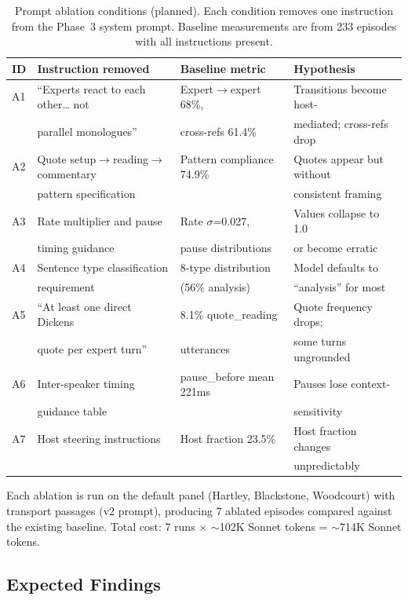 \documentclass[final]{clv2025}
\begin{document}
\begin{table}[t]
\caption{Prompt ablation conditions (planned).  Each condition removes
  one instruction from the Phase~3 system prompt.  Baseline
  measurements are from 233 episodes with all instructions present.}
\label{tab:ablation}
\begin{tabular}{llll}
\toprule
ID & Instruction removed & Baseline metric & Hypothesis \\
\midrule
A1 & ``Experts react to each other\ldots{} not & Expert$\to$expert 68\%,
  & Transitions become host- \\
   & \quad parallel monologues'' & cross-refs 61.4\%
  & \quad mediated; cross-refs drop \\
A2 & Quote setup$\to$reading$\to$commentary & Pattern compliance 74.9\%
  & Quotes appear but without \\
   & \quad pattern specification & & \quad consistent framing \\
A3 & Rate multiplier and pause & Rate $\sigma$=0.027,
  & Values collapse to 1.0 \\
   & \quad timing guidance & pause distributions
  & \quad or become erratic \\
A4 & Sentence type classification & 8-type distribution
  & Model defaults to \\
   & \quad requirement & (56\% analysis)
  & \quad ``analysis'' for most \\
A5 & ``At least one direct Dickens & 8.1\% quote\_reading
  & Quote frequency drops; \\
   & \quad quote per expert turn'' & utterances
  & \quad some turns ungrounded \\
A6 & Inter-speaker timing & pause\_before mean 221ms
  & Pauses lose context- \\
   & \quad guidance table & & \quad sensitivity \\
A7 & Host steering instructions & Host fraction 23.5\%
  & Host fraction changes \\
   & & & \quad unpredictably \\
\bottomrule
\end{tabular}
\end{table}

Each ablation is run on the default panel (Hartley, Blackstone,
Woodcourt) with transport passages (v2 prompt), producing 7 ablated
episodes compared against the existing baseline.  Total cost: 7 runs
$\times$ $\sim$102K Sonnet tokens = $\sim$714K Sonnet tokens.

\subsection{Expected Findings}
\end{document}
